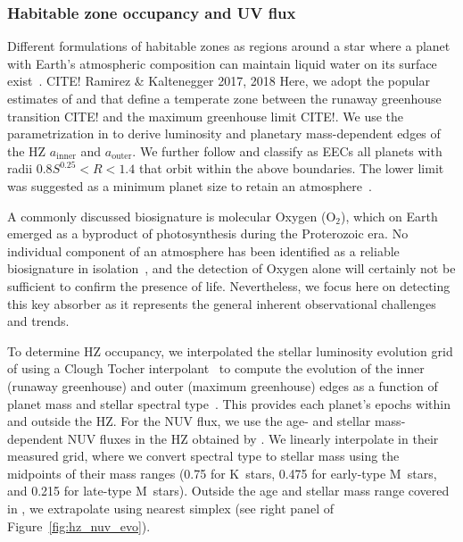 \documentclass[modern,linenumbers]{aastex631}
\begin{document}
\subsubsection{Habitable zone occupancy and UV flux}
Different formulations of habitable zones as regions around a star where a planet with Earth's atmospheric composition can maintain liquid water on its surface exist~\citep[e.g.,][]{MolLous2022,Spinelli2023,Tuchow2023}. CITE! Ramirez \& Kaltenegger 2017, 2018
Here, we adopt the popular estimates of \citet{Kasting1993} and \citet{Kopparapu2013,Kopparapu2014} that define a temperate zone between the runaway greenhouse transition CITE! and the maximum greenhouse limit CITE!.
We use the parametrization in \citet{Kopparapu2014} to derive luminosity and planetary mass-dependent edges of the \gls{HZ} $a_\mathrm{inner}$ and $a_\mathrm{outer}$.
We further follow \citet{Bixel2021} and classify as \glspl{EEC} all planets with radii $0.8 S^{0.25} < R < 1.4 $ that orbit within the above boundaries.
The lower limit was suggested as a minimum planet size to retain an atmosphere~\citep{Zahnle2017}.

A commonly discussed biosignature is molecular Oxygen (O$_2$), which on Earth emerged as a byproduct of photosynthesis during the Proterozoic era.
No individual component of an atmosphere has been identified as a reliable biosignature in isolation~\citep{Seager2016}, and the detection of Oxygen alone will certainly not be sufficient to confirm the presence of life.
Nevertheless, we focus here on detecting this key absorber as it represents the general inherent observational challenges and trends.

To determine \gls{HZ} occupancy, we interpolated the stellar luminosity evolution grid of \citet{Baraffe1998} using a Clough Tocher interpolant~\citep[][see left panel of Figure~\ref{fig:hz_nuv_evo}]{Nielson1983,Alfeld1984} to compute the evolution of the inner (runaway greenhouse) and outer (maximum greenhouse) edges as a function of planet mass and stellar spectral type~\citep{Kopparapu2014}.
This provides each planet's epochs within and outside the \gls{HZ}.
For the \gls{NUV} flux, we use the age- and stellar mass-dependent \gls{NUV} fluxes in the \gls{HZ} obtained by \citet{Richey-Yowell2023}.
We linearly interpolate in their measured grid, where we convert spectral type to stellar mass using the midpoints of their mass ranges (\SI{0.75}{\Msun} for K~stars, \SI{0.475}{\Msun} for early-type M~stars,  and \SI{0.215}{\Msun} for late-type M~stars).
Outside the age and stellar mass range covered in \citet{Richey-Yowell2023}, we extrapolate using nearest simplex (see right panel of Figure~\ref{fig:hz_nuv_evo}).
\end{document}
